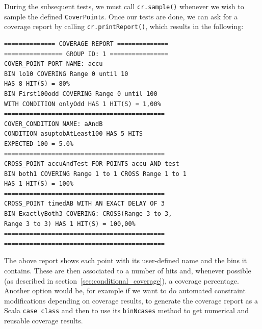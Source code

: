 \documentclass[conference]{IEEEtran}
\begin{document}
During the subsequent tests, we must call \texttt{cr.sample()} whenever we wish to sample the defined \texttt{CoverPoint}s. %
Once our tests are done, we can ask for a coverage report by calling \texttt{cr.printReport()}, which results in the following: 
\begin{verbatim}
============== COVERAGE REPORT ==============
================ GROUP ID: 1 ================
COVER_POINT PORT NAME: accu
BIN lo10 COVERING Range 0 until 10 
HAS 8 HIT(S) = 80%
BIN First100odd COVERING Range 0 until 100 
WITH CONDITION onlyOdd HAS 1 HIT(S) = 1,00%
============================================
COVER_CONDITION NAME: aAndB
CONDITION asuptobAtLeast100 HAS 5 HITS 
EXPECTED 100 = 5.0%
============================================
CROSS_POINT accuAndTest FOR POINTS accu AND test
BIN both1 COVERING Range 1 to 1 CROSS Range 1 to 1 
HAS 1 HIT(S) = 100%
============================================
CROSS_POINT timedAB WITH AN EXACT DELAY OF 3
BIN ExactlyBoth3 COVERING: CROSS(Range 3 to 3, 
Range 3 to 3) HAS 1 HIT(S) = 100,00%
============================================
============================================
\end{verbatim}
The above report shows each point with its user-defined name and the bins it contains. These are then associated to a number of hits and, whenever possible (as described in section~\ref{sec:conditional_coverage}), a coverage percentage.
Another option would be, for example if we want to do automated constraint modifications depending on coverage results, to generate the coverage report as a Scala \texttt{case class} and then to use its \texttt{binNcases} method to get numerical and reusable coverage results.  
\end{document}
